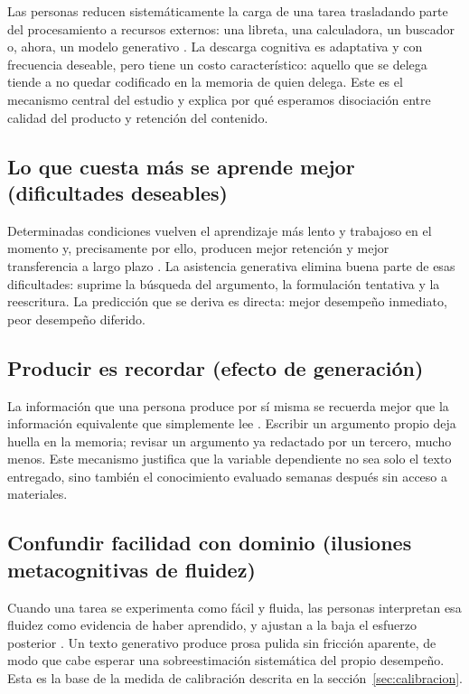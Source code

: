 \documentclass[12pt,a4paper,openany]{report}
\begin{document}
    Las personas reducen sistem\'aticamente la carga de una tarea trasladando parte del procesamiento a recursos externos: una libreta, una calculadora, un buscador o, ahora, un modelo generativo \citep{risko2016cognitive}. La descarga cognitiva es adaptativa y con frecuencia deseable, pero tiene un costo caracter\'istico: aquello que se delega tiende a no quedar codificado en la memoria de quien delega. Este es el mecanismo central del estudio y explica por qu\'e esperamos disociaci\'on entre calidad del producto y retenci\'on del contenido.
    
    \subsection{Lo que cuesta m\'as se aprende mejor (dificultades deseables)}
    
    Determinadas condiciones vuelven el aprendizaje m\'as lento y trabajoso en el momento y, precisamente por ello, producen mejor retenci\'on y mejor transferencia a largo plazo \citep{bjork2013self}. La asistencia generativa elimina buena parte de esas dificultades: suprime la b\'usqueda del argumento, la formulaci\'on tentativa y la reescritura. La predicci\'on que se deriva es directa: mejor desempe\~no inmediato, peor desempe\~no diferido.
    
    \subsection{Producir es recordar (efecto de generaci\'on)}
    
    La informaci\'on que una persona produce por s\'i misma se recuerda mejor que la informaci\'on equivalente que simplemente lee \citep{slamecka1978generation}. Escribir un argumento propio deja huella en la memoria; revisar un argumento ya redactado por un tercero, mucho menos. Este mecanismo justifica que la variable dependiente no sea solo el texto entregado, sino tambi\'en el conocimiento evaluado semanas despu\'es sin acceso a materiales.
    
    \subsection{Confundir facilidad con dominio (ilusiones metacognitivas de fluidez)}
    
    Cuando una tarea se experimenta como f\'acil y fluida, las personas interpretan esa fluidez como evidencia de haber aprendido, y ajustan a la baja el esfuerzo posterior \citep{bjork2013self}. Un texto generativo produce prosa pulida sin fricci\'on aparente, de modo que cabe esperar una sobreestimaci\'on sistem\'atica del propio desempe\~no. Esta es la base de la medida de calibraci\'on descrita en la secci\'on~\ref{sec:calibracion}.
    
\end{document}
